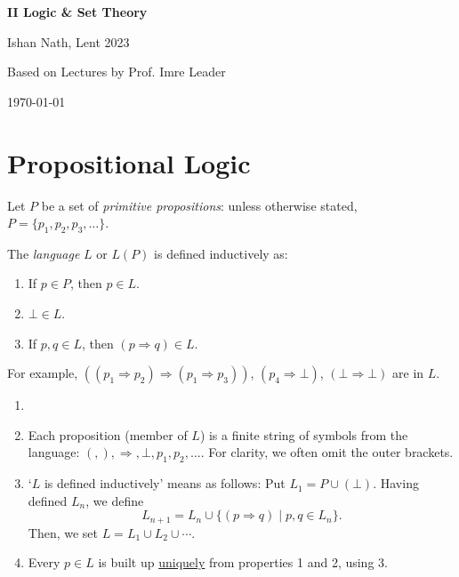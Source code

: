 \documentclass[12pt]{article}
\begin{document}
\hypersetup{pageanchor=false}
\begin{titlepage}
	\begin{center}
		\vspace*{1em}
		\Huge
		\textbf{II Logic \& Set Theory}

		\vspace{1em}
		\large
		Ishan Nath, Lent 2023

		\vspace{1.5em}

		\Large

		Based on Lectures by Prof. Imre Leader

		\vspace{1em}

		\large
		\today
	\end{center}
	
\end{titlepage}
\hypersetup{pageanchor=true}

\tableofcontents

\newpage

\section{Propositional Logic}
\label{sec:propositional_logic}

Let $P$ be a set of \emph{primitive propositions}: unless otherwise stated, $P = \{p_1, p_2, p_3, \ldots\}$.

The \emph{language} $L$ or $L(P)$ is defined inductively as:
\begin{enumerate}
	\item If $p \in P$, then $p \in L$.
	\item $\bot \in L$.
	\item If $p, q \in L$, then $(p \Rightarrow q) \in L$.
\end{enumerate}

For example, $((p_1 \Rightarrow p_2) \Rightarrow (p_1 \Rightarrow p_3))$, $(p_4 \Rightarrow \bot)$, $(\bot \Rightarrow \bot)$ are in $L$.

\begin{remark}
	\begin{enumerate}
		\item[]
		\item Each proposition (member of $L$) is a finite string of symbols from the language: $(, ), \Rightarrow, \bot, p_1, p_2, \ldots$. For clarity, we often omit the outer brackets.
		\item `$L$ is defined inductively' means as follows: Put $L_1 =  P \cup (\bot)$. Having defined $L_n$, we define
			\[
				L_{n+1} = L_n \cup \{(p \Rightarrow q) \mid p, q \in L_n\}
			.\]
			Then, we set $L = L_1 \cup L_2 \cup \cdots$.
		\item Every $p \in L$ is built up \underline{uniquely} from properties 1 and 2, using 3.
	\end{enumerate}
\end{remark}
\end{document}

